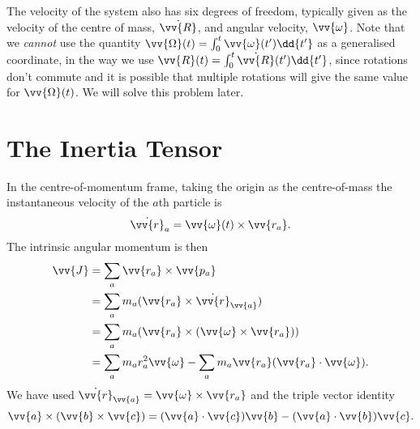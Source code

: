 \documentclass[fleqn]{NotesClass}
\begin{document}
    The velocity of the system also has six degrees of freedom, typically given as the velocity of the centre of mass, \(\dot{\vv{R}}\), and angular velocity, \(\vv{\omega}\).
    Note that we \emph{cannot} use the quantity \(\vv{\Omega}(t) = \int_0^t \vv{\omega}(t') \dd{t'}\) as a generalised coordinate, in the way we use \(\vv{R}(t) = \int_{0}^{t} \dot{\vv{R}}(t') \dd{t'}\), since rotations don't commute and it is possible that multiple rotations will give the same value for \(\vv{\Omega}(t)\).
    We will solve this problem later.
    
    \section{The Inertia Tensor}
    In the centre-of-momentum frame, taking the origin as the centre-of-mass the instantaneous velocity of the \(a\)th particle is
    \begin{equation}
        \dot{\vv{r}}_a = \vv{\omega}(t) \times \vv{r_a}.
    \end{equation}
    The intrinsic angular momentum is then
    \begin{align}
        \vv{J} &= \sum_{a} \vv{r_a} \times \vv{p_a}\\
        &= \sum_{a} m_a (\vv{r_a} \times \dot{\vv{r}}_{\vv{a}})\\
        &= \sum_{a} m_a (\vv{r_a} \times (\vv{\omega} \times \vv{r_a}))\\
        &= \sum_{a} m_ar_a^2\vv{\omega} - \sum_{a} m_a \vv{r_a} (\vv{r_a} \cdot \vv{\omega}).\label{eqn:J = Iomeag}
    \end{align}
    We have used \(\dot{\vv{r}}_{\vv{a}} = \vv{\omega} \times \vv{r_a}\) and the triple vector identity
    \begin{equation}
        \vv{a} \times (\vv{b} \times \vv{c}) = (\vv{a} \cdot \vv{c}) \vv{b} - (\vv{a} \cdot \vv{b}) \vv{c}.
    \end{equation}
    
\end{document}
